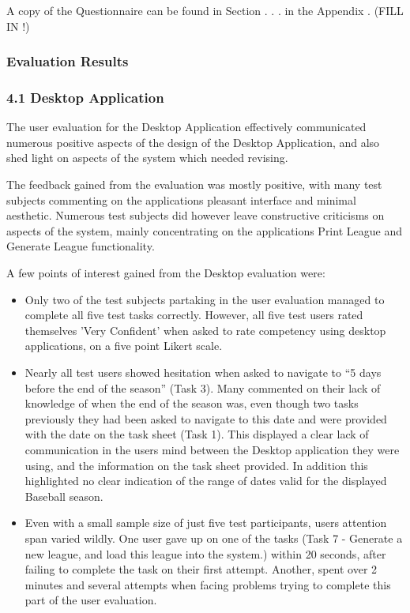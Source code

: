 A copy of the Questionnaire can be found in Section . . .  in the Appendix . 
(FILL IN !) 

\subsubsection{Evaluation Results}

\subsubsection{4.1 Desktop Application}

The user evaluation for the Desktop Application effectively communicated 
numerous positive aspects of the design of the Desktop Application, and also 
shed light on aspects of the system which needed revising.

The feedback gained from the evaluation was mostly positive, with many test 
subjects commenting on the applications pleasant interface and minimal 
aesthetic. Numerous test subjects did however leave constructive criticisms on 
aspects of the system, mainly concentrating on the applications Print League 
and Generate League functionality. 

A few points of interest gained from the Desktop evaluation were: 

\begin{itemize}
\item Only two of the test subjects partaking in the user evaluation managed to 
complete all five test tasks correctly. However, all five test users rated 
themselves 'Very Confident' when asked to rate competency using desktop 
applications, on a five point Likert scale. 
\item Nearly all test users showed hesitation when asked to navigate to ``5 
days before the end of the season'' (Task 3). Many commented on their lack of 
knowledge of when the end of the season was, even though two tasks previously 
they had been asked to navigate to this date and were provided with the date on 
the task sheet (Task 1). This displayed a clear lack of communication in the 
users mind between the Desktop application they were using, and the information 
on the task sheet provided. In addition this highlighted no clear indication of 
the range of dates valid for the displayed Baseball season.     
\item Even with a small sample size of just five test participants, users 
attention span varied wildly. One user gave up on one of the tasks (Task 7 - 
Generate a new league, and load this league into the system.) within 20 
seconds, after failing to complete the task on their first attempt. Another, 
spent over 2 minutes and several attempts when facing problems trying to 
complete this part of the user evaluation.
\end{itemize}

